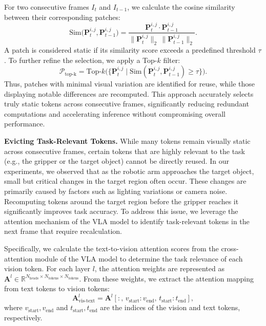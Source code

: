 For two consecutive frames \(I_t\) and \(I_{t-1}\), we calculate the cosine similarity between their corresponding patches:
\begin{equation}
\label{eq:sim}
\text{Sim}\big(\mathbf{P}_t^{i,j}, \mathbf{P}_{t-1}^{i,j}\big) 
= \frac{\mathbf{P}_t^{i,j} \cdot \mathbf{P}_{t-1}^{i,j}}{\|\mathbf{P}_t^{i,j}\|_2 \,\|\mathbf{P}_{t-1}^{i,j}\|_2}.
\end{equation}
A patch is considered static if its similarity score exceeds a predefined threshold \(\tau\). To further refine the selection, we apply a Top-\(k\) filter:
\begin{equation}
\label{eq:topk}
\mathcal{P}_{\mathrm{top\text{-}k}}
= \mathrm{Top}\text{-}k \Big(\{\mathbf{P}_t^{i,j} \mid \mathrm{Sim}(\mathbf{P}_t^{i,j}, \mathbf{P}_{t-1}^{i,j}) \ge \tau\}\Big).
\end{equation}
Thus, patches with minimal visual variation are identified for reuse, while those displaying notable differences are recomputed. This approach accurately selects truly static tokens across consecutive frames, significantly reducing redundant computations and accelerating inference without compromising overall performance.

\textbf{Evicting Task-Relevant Tokens.}
While many tokens remain visually static across consecutive frames, certain tokens that are highly relevant to the task (e.g., the gripper or the target object) cannot be directly reused. In our experiments, we observed that as the robotic arm approaches the target object, small but critical changes in the target region often occur. These changes are primarily caused by factors such as lighting variations or camera noise. Recomputing tokens around the target region before the gripper reaches it significantly improves task accuracy. To address this issue, we leverage the attention mechanism of the VLA model to identify task-relevant tokens in the next frame that require recalculation.

Specifically, we calculate the text-to-vision attention scores from the cross-attention module of the VLA model to determine the task relevance of each vision token. For each layer \( l \), the attention weights are represented as 
\(\mathbf{A}^l \in \mathbb{R}^{N_{\text{heads}} \times N_{\text{tokens}} \times N_{\text{tokens}}}\). 
From these weights, we extract the attention mapping from text tokens to vision tokens:
\begin{equation}
\label{eq:avistext}
\mathbf{A}^l_{\text{vis-text}} 
= \mathbf{A}^l[:,\, v_{\text{start}} : v_{\text{end}},\, t_{\text{start}} : t_{\text{end}}],
\end{equation}
where \( v_{\text{start}}, v_{\text{end}} \) and \( t_{\text{start}}, t_{\text{end}} \) are the indices of the vision and text tokens, respectively.

